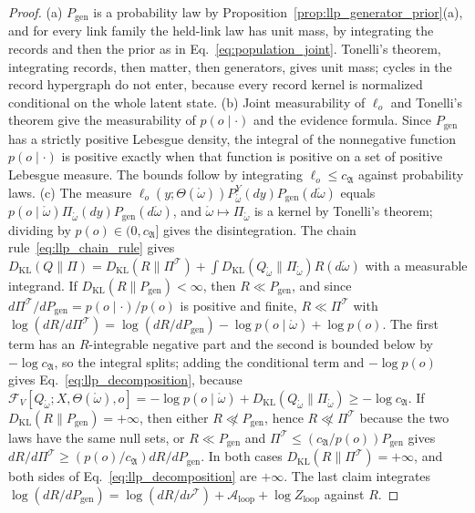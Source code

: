 \begin{proof}
(a) $P_{\mathrm{gen}}$ is a probability law by Proposition~\ref{prop:llp_generator_prior}(a), and for every link family the held-link law has unit mass, by integrating the records and then the prior as in Eq.~\eqref{eq:population_joint}. Tonelli's theorem, integrating records, then matter, then generators, gives unit mass; cycles in the record hypergraph do not enter, because every record kernel is normalized conditional on the whole latent state.
(b) Joint measurability of $\ell_o$ and Tonelli's theorem give the measurability of $p(o\mid\cdot)$ and the evidence formula. Since $P_{\mathrm{gen}}$ has a strictly positive Lebesgue density, the integral of the nonnegative function $p(o\mid\cdot)$ is positive exactly when that function is positive on a set of positive Lebesgue measure. The bounds follow by integrating $\ell_o\leq c_{\mathfrak A}$ against probability laws.
(c) The measure $\ell_o(y;\Theta(\mathring\omega))P^Y_{\mathring\omega}(dy)P_{\mathrm{gen}}(d\mathring\omega)$ equals $p(o\mid\mathring\omega)\Pi_{\mathring\omega}(dy)P_{\mathrm{gen}}(d\mathring\omega)$, and $\mathring\omega\mapsto\Pi_{\mathring\omega}$ is a kernel by Tonelli's theorem; dividing by $p(o)\in(0,c_{\mathfrak A}]$ gives the disintegration. The chain rule~\eqref{eq:llp_chain_rule} gives $D_{\mathrm{KL}}(Q\|\Pi)=D_{\mathrm{KL}}(R\|\Pi^{\mathcal T})+\int D_{\mathrm{KL}}(Q_{\mathring\omega}\|\Pi_{\mathring\omega})R(d\mathring\omega)$ with a measurable integrand. If $D_{\mathrm{KL}}(R\|P_{\mathrm{gen}})<\infty$, then $R\ll P_{\mathrm{gen}}$, and since $d\Pi^{\mathcal T}/dP_{\mathrm{gen}}=p(o\mid\cdot)/p(o)$ is positive and finite, $R\ll\Pi^{\mathcal T}$ with $\log(dR/d\Pi^{\mathcal T})=\log(dR/dP_{\mathrm{gen}})-\log p(o\mid\mathring\omega)+\log p(o)$. The first term has an $R$-integrable negative part and the second is bounded below by $-\log c_{\mathfrak A}$, so the integral splits; adding the conditional term and $-\log p(o)$ gives Eq.~\eqref{eq:llp_decomposition}, because $\mathcal F_V[Q_{\mathring\omega};X,\Theta(\mathring\omega),o]=-\log p(o\mid\mathring\omega)+D_{\mathrm{KL}}(Q_{\mathring\omega}\|\Pi_{\mathring\omega})\geq-\log c_{\mathfrak A}$. If $D_{\mathrm{KL}}(R\|P_{\mathrm{gen}})=+\infty$, then either $R\not\ll P_{\mathrm{gen}}$, hence $R\not\ll\Pi^{\mathcal T}$ because the two laws have the same null sets, or $R\ll P_{\mathrm{gen}}$ and $\Pi^{\mathcal T}\leq(c_{\mathfrak A}/p(o))P_{\mathrm{gen}}$ gives $dR/d\Pi^{\mathcal T}\geq(p(o)/c_{\mathfrak A})dR/dP_{\mathrm{gen}}$. In both cases $D_{\mathrm{KL}}(R\|\Pi^{\mathcal T})=+\infty$, and both sides of Eq.~\eqref{eq:llp_decomposition} are $+\infty$. The last claim integrates $\log(dR/dP_{\mathrm{gen}})=\log(dR/d\nu^{\mathcal T})+\mathcal A_{\mathrm{loop}}+\log Z_{\mathrm{loop}}$ against $R$.
\end{proof}

